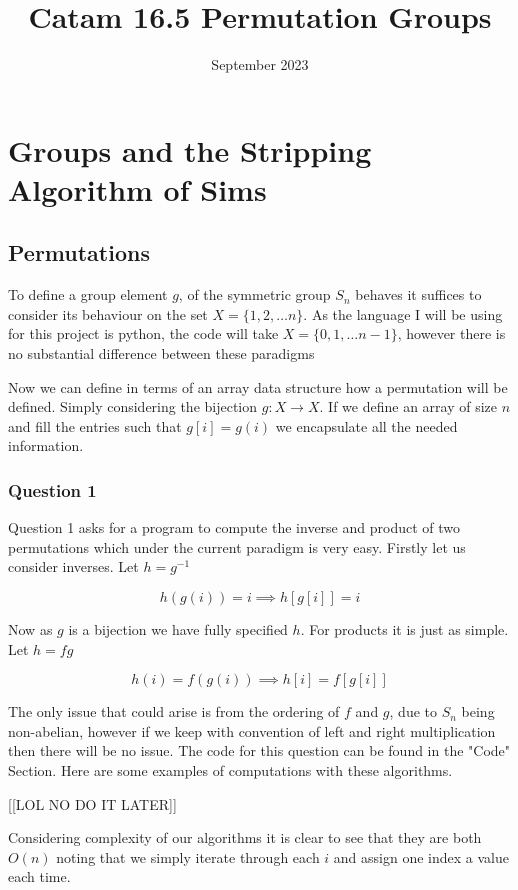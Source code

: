 \documentclass{article}
\begin{document}
\title{Catam 16.5 Permutation Groups}
\date{September 2023}

\section{Groups and the Stripping Algorithm of Sims}
\subsection{Permutations}

To define a group element $g$, of the symmetric group $S_n$ behaves it suffices
to consider its behaviour on the set $X = \{1, 2, \dots n\}$. As the language
I will be using for this project is python, the code will take $X = \{0, 1, \dots n-1\}$, however there is no substantial difference between these paradigms

\vspace*{5mm}

Now we can define in terms of an array data structure how a permutation will be defined.
Simply considering the bijection $g : X \rightarrow X$. If we define an array of size $n$ and fill the entries such that
$g[i] = g(i)$ we encapsulate all the needed information.

\subsubsection{Question 1}

Question 1 asks for a program to compute the inverse and product of two permutations which under the current paradigm is very easy.
Firstly let us consider inverses. Let $h = g^{-1}$

$$h(g(i)) = i \implies h[g[i]] = i$$

Now as $g$ is a bijection we have fully specified $h$. For products it is just as simple. Let $h = fg$

$$h(i) = f(g(i)) \implies h[i] = f[g[i]]$$

The only issue that could arise is from the ordering of $f$ and $g$, due to $S_n$ being non-abelian, however if we keep with convention of left and right multiplication then there will be no issue.
The code for this question can be found in the "Code" Section. Here are some examples of computations with these algorithms.

	[[LOL NO DO IT LATER]]

\vspace*{5mm}

Considering complexity of our algorithms it is clear to see that they are both $O(n)$ noting that we simply iterate through each $i$ and assign one index a value each time.
\end{document}
